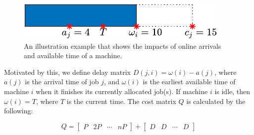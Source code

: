 \begin{figure}[h]
	\centering
\includegraphics[width=0.7\linewidth]{figs/arrival_ex}
	\caption{An illustration example that shows the impacts of online arrivals and available time of a machine.}
	\label{fig:arrival_ex}
\end{figure}



Motivated by this, we define delay matrix  $D(j,i) = \omega(i) - a(j)$, where $a(j)$ is the arrival time of job $j$, and $\omega(i)$ is the earliest available time of machine $i$ when it finishes its currently allocated job(s). If machine $i$ is idle, then $\omega(i) = T$, where $T$ is the current time. The cost matrix $Q$ is calculated by the following: 

\begin{equation}
Q = \begin{bmatrix}
P & 2P &\cdots& nP
\end{bmatrix} + \begin{bmatrix}
D & D &\cdots& D
\end{bmatrix}
\label{eq:generate_cost}
\end{equation}






